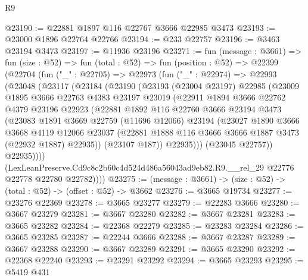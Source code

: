 \begin{lexlean}{R9}
\begin{coremodule}
@23190 := @22881 @1897 @116 @22767 @3666 @22985 @3473
@23193 := @23000 @1896 @22764 @22766
@23194 := @233 @22757
@23196 := @3463 @23194 @3473
@23197 := @11936 @23196
@23271 := fun (message : @3661) =>
  fun (size : @52) =>
  fun (total : @52) =>
  fun (position : @52) =>
  @22399
    (@22704
      (fun ("_" : @22705) =>
      @22973
        (fun ("_" : @22974) =>
        @22993
          (@23048
            (@23117
              (@23184
                (@23190
                  (@23193
                    (@23004 @23197)
                    @22985
                    (@23009
                      @1895
                      @3666
                      @22763
                      @4383
                      @23197
                      @23019
                      (@22911
                        @1894
                        @3666
                        @22762
                        @4379
                        @23196
                        @22923
                        (@22881
                          @1892
                          @116
                          @22760
                          @3666
                          @23194
                          @3473
                          (@23083
                            @1891
                            @3669
                            @22759
                            (@11696 @12066)
                            @23194
                            (@23027
                              @1890
                              @3666
                              @3668
                              @4119
                              @12066
                              @23037
                              (@22881 @1888 @116 @3666 @3666 @1887 @3473 (@22932 @1887) @22935))
                            (@23107 @187))
                          @22935)))
                    (@23045 @22757))
                  @22935))))
          (LexLeanPreserve.Cd9c8c2b60c4d524d486a56043ad9eb82.R9.__rel_29
            @22776
            @22778
            @22780
            @22782))))
@23275 := (message : @3661) -> (size : @52) -> (total : @52) -> (offset : @52) -> @3662
@23276 := @3665 @19734
@23277 := @23276 @22369
@23278 := @3665 @23277
@23279 := @22283 @3666
@23280 := @3667 @23279
@23281 := @3667 @23280
@23282 := @3667 @23281
@23283 := @3665 @23282
@23284 := @22368 @22279
@23285 := @23283 @23284
@23286 := @3665 @23285
@23287 := @22244 @3666
@23288 := @3667 @23287
@23289 := @3667 @23288
@23290 := @3667 @23289
@23291 := @3665 @23290
@23292 := @22368 @22240
@23293 := @23291 @23292
@23294 := @3665 @23293
@23295 := @5419 @431

\end{coremodule}
\end{lexlean}
